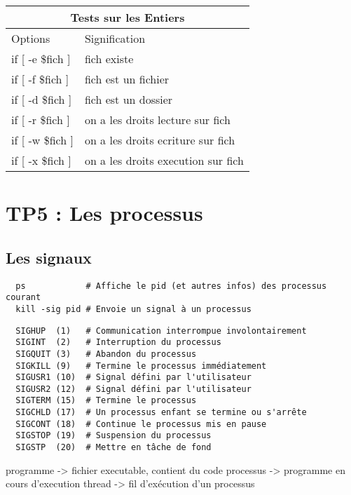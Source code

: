 \documentclass{article}
\begin{document}
\begin{tabular}{ |p{4cm}||p{4cm}| }
 \hline
 \multicolumn{2}{|c|}{Tests sur les Entiers} \\
 \hline
  Options & Signification \\
 \hline
  if [ -e \$fich ] & fich existe\\
  if [ -f \$fich ] & fich est un fichier\\
  if [ -d \$fich ] & fich est un dossier\\
  if [ -r \$fich ] & on a les droits lecture sur fich\\
  if [ -w \$fich ] & on a les droits ecriture sur fich\\
  if [ -x \$fich ] & on a les droits execution sur fich\\
 \hline
\end{tabular}

\section{TP5 : Les processus}

\subsection{Les signaux}

\begin{verbatim}
  ps            # Affiche le pid (et autres infos) des processus courant
  kill -sig pid # Envoie un signal à un processus
\end{verbatim}

\begin{verbatim}
  SIGHUP  (1)   # Communication interrompue involontairement
  SIGINT  (2)   # Interruption du processus
  SIGQUIT (3)   # Abandon du processus
  SIGKILL (9)   # Termine le processus immédiatement
  SIGUSR1 (10)  # Signal défini par l'utilisateur
  SIGUSR2 (12)  # Signal défini par l'utilisateur
  SIGTERM (15)  # Termine le processus 
  SIGCHLD (17)  # Un processus enfant se termine ou s'arrête
  SIGCONT (18)  # Continue le processus mis en pause
  SIGSTOP (19)  # Suspension du processus
  SIGSTP  (20)  # Mettre en tâche de fond
\end{verbatim}

programme -> fichier executable, contient du code
processus -> programme en cours d'execution
thread -> fil d'exécution d'un processus
\end{document}
